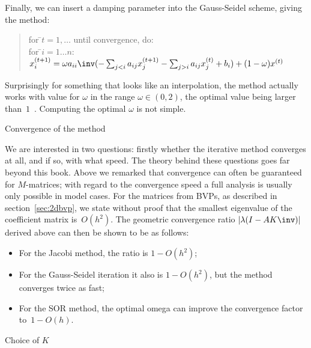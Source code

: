 Finally, we can insert a damping parameter into the Gauss-Seidel
scheme, giving the  method:
\begin{quote}
  \begin{tabbing}
    for \=$t=1,\ldots$ until convergence, do:\\
    \>for \=$i=1\ldots n$:\\
    \>\>$x^{(t+1)}_i = \omega a_{ii}\inv (-\sum_{j<i} a_{ij}x_j^{(t+1)} -
                      \sum_{j>i} a_{ij}x_j^{(t)} + b_i)
        +(1-\omega)x^{(t)}$\\
  \end{tabbing}
\end{quote}
Surprisingly for something that looks like an interpolation, the
method actually works with value for $\omega$ in the range
$\omega\in(0,2)$, the optimal value being larger
than~$1$~\cite{HaYo:applied}. Computing the optimal $\omega$ is not
simple.

 {Convergence of the method}

We are interested in two questions: firstly whether the iterative
method converges at all, and if so, with what speed.  The theory
behind these questions goes far beyond this book. Above we remarked
that convergence can often be guaranteed for $M$-matrices; with regard to
the convergence speed a full analysis is usually only possible in
model cases. For the matrices from \acp{BVP}, as described in
section~\ref{sec:2dbvp}, we state without proof that the smallest
eigenvalue of the coefficient matrix is~$O(h^2)$. The geometric
convergence ratio $|\lambda(I-AK\inv)|$ derived above can then be
shown to be as follows:
\begin{itemize}
\item For the Jacobi method, the ratio is $1-O(h^2)$;
\item For the Gauss-Seidel iteration it also is $1-O(h^2)$, but the
  method converges twice as fast;
\item For the SOR method, the optimal omega can improve the
  convergence factor to~$1-O(h)$.
\end{itemize}

 {Choice of $K$}
\label{sec:preconditioner}

